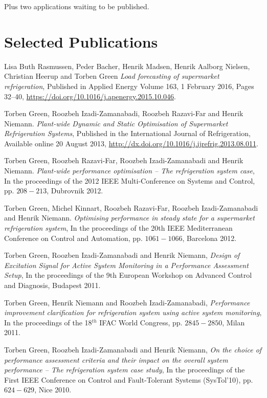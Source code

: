\documentclass[margin,line,a4paper]{resume}
\begin{document}
\begin{resume}
Plus two applications waiting to be published.

\section{\mysidestyle Selected Publications}

Lisa Buth Rasmussen, Peder Bacher, Henrik Madsen, Henrik Aalborg Nielsen, Christian Heerup and Torben Green \textit{Load forecasting of supermarket refrigeration}, Published in Applied Energy Volume 163, 1 February 2016, Pages 32–40, \href{https://doi.org/10.1016/j.apenergy.2015.10.046}{https://doi.org/10.1016/j.apenergy.2015.10.046}.

Torben Green, Roozbeh Izadi-Zamanabadi, Roozbeh Razavi-Far and Henrik Niemann. \textit{Plant-wide Dynamic and Static Optimisation of Supermarket Refrigeration Systems}, Published in the International Journal of Refrigeration, Available online 20 August 2013, \href{http://dx.doi.org/10.1016/j.ijrefrig.2013.08.011}{http://dx.doi.org/10.1016/j.ijrefrig.2013.08.011}.

Torben Green, Roozbeh Razavi-Far, Roozbeh Izadi-Zamanabadi and Henrik Niemann. \textit{Plant-wide performance optimisation -- The refrigeration system case}, In the proceedings of the 2012 IEEE Multi-Conference on Systems and Control, pp. $208-213$, Dubrovnik 2012.

Torben Green, Michel Kinnart, Roozbeh Razavi-Far, Roozbeh Izadi-Zamanabadi and Henrik Niemann. \textit{Optimising performance in steady state for a supermarket refrigeration system}, In the proceedings of the 20th IEEE Mediterranean Conference on Control and Automation, pp. $1061-1066$, Barcelona 2012.

Torben Green, Roozben Izadi-Zamanabadi and Henrik Niemann, \textit{Design of Excitation Signal for Active System Monitoring in a Performance Assessment Setup}, In the proceedings of the 9th European Workshop on Advanced Control and Diagnosis, Budapest 2011.

Torben Green, Henrik Niemann and Roozbeh Izadi-Zamanabadi, \textit{Performance improvement clarification for refrigeration system using active system monitoring}, In the proceedings of the 18$^{th}$ IFAC World Congress, pp. $2845-2850$, Milan 2011. 

Torben Green, Roozbeh Izadi-Zamanabadi and Henrik Niemann, \textit{On the choice of performance assessment criteria and their impact on the overall system performance -- The refrigeration system case study}, In the proceedings of the First IEEE Conference on Control and Fault-Tolerant Systems (SysTol'10), pp. $624-629$, Nice 2010.



\end{resume}
\end{document}
